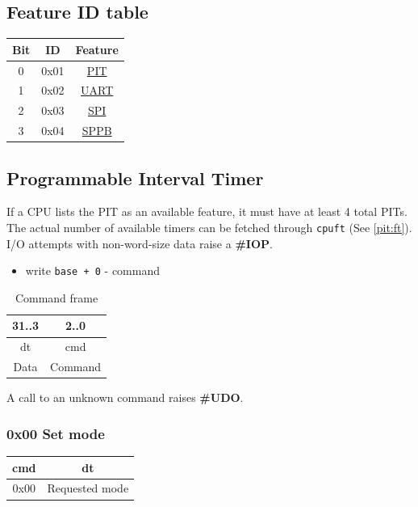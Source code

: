 \documentclass[a4paper,10pt]{article}
\begin{document}
\subsection{Feature ID table} \label{hw:fid}
\begin{table}[H]
	\centering
	{
		\begin{tabular}{|c|c|c|}
\hline
Bit & ID & Feature \\
\hline
0 & 0x01 & \hyperref[hw:pit]{PIT} \\
\hline
1 & 0x02 & \hyperref[hw:uart]{UART} \\
\hline
2 & 0x03 & \hyperref[hw:spi]{SPI} \\
\hline
3 & 0x04 & \hyperref[SPPB-SPPB]{SPPB} \\
\hline
		\end{tabular}
	}
\end{table}

\subsection{Programmable Interval Timer} \label{hw:pit}
If a CPU lists the PIT as an available feature, it must have at least 4 total PITs. The actual number of available timers can be fetched through \verb|cpuft| (See \ref{pit:ft}). I/O attempts with non-word-size data raise a \textbf{\#IOP}.

\begin{itemize}
	\item write \verb|base + 0| - command
\end{itemize}

\begin{table}[H]
	\centering
	\caption{Command frame}
	{
		\begin{tabular}{|c|c|}
\hline
31..3 & 2..0 \\
\hline
dt & cmd \\
\hline
Data & Command \\
\hline
		\end{tabular}
	}
\end{table}

A call to an unknown command raises \textbf{\#UDO}.

\subsubsection{0x00 Set mode}
\begin{table}[H]
	\centering
	{
		\begin{tabular}{|c|c|}
\hline
cmd & dt \\
\hline
0x00 & Requested mode \\
\hline
		\end{tabular}
	}
\end{table}
\end{document}
